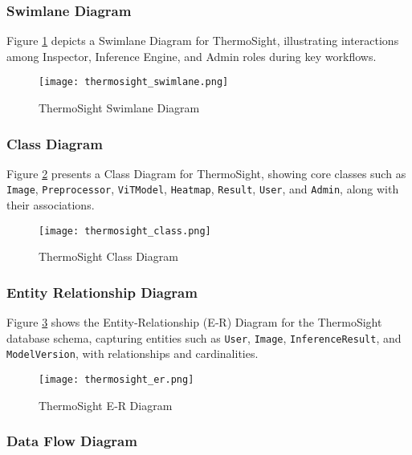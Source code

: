 \subsubsection{Swimlane Diagram}

Figure \ref{fig:ts_swimlane} depicts a Swimlane Diagram for ThermoSight, illustrating interactions among Inspector, Inference Engine, and Admin roles during key workflows.

\begin{figure}[H]
    \centering
    \texttt{[image: thermosight\_swimlane.png]}
    \caption{ThermoSight Swimlane Diagram}
    \label{fig:ts_swimlane}
\end{figure}

\subsubsection{Class Diagram}

Figure \ref{fig:ts_class} presents a Class Diagram for ThermoSight, showing core classes such as \texttt{Image}, \texttt{Preprocessor}, \texttt{ViTModel}, \texttt{Heatmap}, \texttt{Result}, \texttt{User}, and \texttt{Admin}, along with their associations.

\begin{figure}[H]
    \centering
    \texttt{[image: thermosight\_class.png]}
    \caption{ThermoSight Class Diagram}
    \label{fig:ts_class}
\end{figure}

\subsubsection*{Entity Relationship Diagram}

Figure \ref{fig:ts_er} shows the Entity‐Relationship (E‐R) Diagram for the ThermoSight database schema, capturing entities such as \texttt{User}, \texttt{Image}, \texttt{InferenceResult}, and \texttt{ModelVersion}, with relationships and cardinalities.

\begin{figure}[H]
    \centering
    \texttt{[image: thermosight\_er.png]}
    \caption{ThermoSight E‐R Diagram}
    \label{fig:ts_er}
\end{figure}

\subsubsection{Data Flow Diagram}


